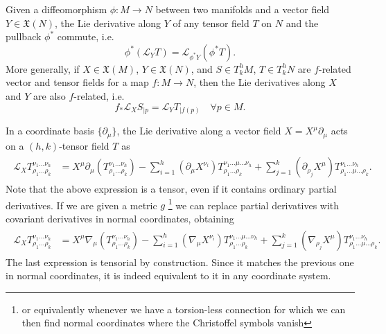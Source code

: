 \begin{mytheorem}
Given a diffeomorphism $\phi: M \to N$ between two manifolds and a vector field $Y\in \mathfrak{X}(N)$, the Lie derivative along $Y$ of any tensor field $T$ on $N$ and the pullback $\phi^*$ commute, i.e.
\begin{equation}
    \phi^* (\mathcal{L}_Y T) = \mathcal{L}_{\phi^* Y} (\phi^* T).
\end{equation}
%
More generally, if $X\in \mathfrak{X}(M)$, $Y\in \mathfrak{X}(N)$, and $S\in T^h_kM$, $T\in T^h_kN$ are $f$-related vector and tensor fields for a map $f:M\to N$, then the Lie derivatives along $X$ and $Y$ are also $f$-related, i.e.
\begin{equation}
    f_*\mathcal{L}_XS_{|p}= \mathcal{L}_Y T_{|f(p)} \quad \forall p\in M.
\end{equation}
\end{mytheorem}



\begin{mytheorem}
In a coordinate basis $\{\partial_\mu\}$, the Lie derivative along a vector field $X = X^{\mu} \partial_\mu$ acts on a $(h,k)$-tensor field $T$ as
\begin{align}
\begin{aligned}
    \mathcal{L}_X T^{\nu_1 \dots \nu_h}_{ \rho_1 \dots \rho_k} 
    &= X^{\mu} \partial_\mu\left( T^{\nu_1 \dots \nu_h}_{ \rho_1 \dots \rho_k} \right)
    - \sum_{i=1}^h \left(\partial_\mu X^{\nu_i}\right) T^{\nu_1 \dots \mu \dots \nu_h}_{ \rho_1 \dots \rho_k} 
    + \sum_{j=1}^k \left(\partial_{\rho_j} X^{\mu}\right) T^{\nu_1 \dots \nu_h}_{\rho_1 \dots \mu \dots \rho_k}.
\end{aligned}  
\end{align}
Note that the above expression is a tensor, even if it contains ordinary partial derivatives.
If we are given a metric $g$ \footnote{or equivalently whenever we have a torsion-less connection for which we can then find normal coordinates where the Christoffel symbols vanish} we can replace partial derivatives with covariant derivatives in normal coordinates, obtaining
\begin{align}
\begin{aligned}
    \mathcal{L}_X T^{\nu_1 \dots \nu_h}_{ \rho_1 \dots \rho_k} 
    &= X^{\mu} \nabla_\mu\left( T^{\nu_1 \dots \nu_h}_{ \rho_1 \dots \rho_k} \right)
    - \sum_{i=1}^h \left(\nabla_\mu X^{\nu_i}\right) T^{\nu_1 \dots \mu \dots \nu_h}_{ \rho_1 \dots \rho_k} 
    + \sum_{j=1}^k \left(\nabla_{\rho_j} X^{\mu}\right) T^{\nu_1 \dots \nu_h}_{\rho_1 \dots \mu \dots \rho_k}.
\end{aligned}
\end{align}
The last expression is tensorial by construction.
Since it matches the previous one in normal coordinates, it is indeed equivalent to it in any coordinate system.
\end{mytheorem}



